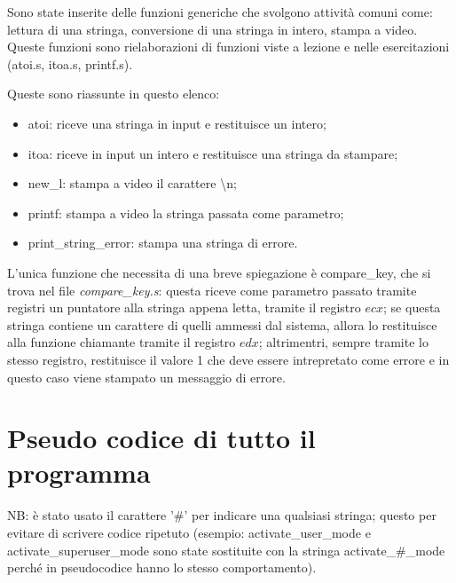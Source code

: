 \documentclass[a4paper,titlepage]{book}
\begin{document}
Sono state inserite delle funzioni generiche che svolgono attività comuni come: lettura di una stringa, conversione di una stringa in intero, stampa a video. Queste funzioni sono rielaborazioni di funzioni viste a lezione e nelle esercitazioni (atoi.s, itoa.s, printf.s).

Queste sono riassunte in questo elenco:

\begin{itemize}

\item atoi: riceve una stringa in input e restituisce un intero;
\item itoa: riceve in input un intero e restituisce una stringa da stampare;
\item new\_l: stampa a video il carattere \textbackslash n;
\item printf: stampa a video la stringa passata come parametro;
\item print\_string\_error: stampa una stringa di errore.

\end{itemize}

L'unica funzione che necessita di una breve spiegazione è compare\_key, che si trova nel file \textit{compare\_key.s}: questa riceve come parametro passato tramite registri un puntatore alla stringa appena letta, tramite il registro $ecx$; se questa stringa contiene un carattere di quelli ammessi dal sistema, allora lo restituisce alla funzione chiamante tramite il registro $edx$; altrimentri, sempre tramite lo stesso registro, restituisce il valore 1 che deve essere intrepretato come errore e in questo caso viene stampato un messaggio di errore.

\newpage
\section{Pseudo codice di tutto il programma}

NB: è stato usato il carattere '\#' per indicare una qualsiasi stringa; questo per evitare di scrivere codice ripetuto (esempio: activate\_user\_mode e activate\_superuser\_mode sono state sostituite con la stringa activate\_\#\_mode perché in pseudocodice hanno lo stesso comportamento).
\end{document}
